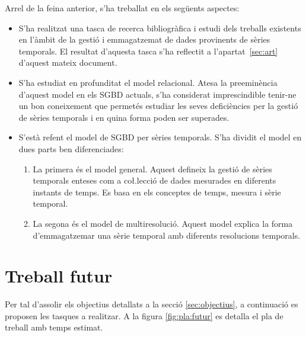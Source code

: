 Arrel de la feina anterior, s'ha treballat en els següents aspectes:
\begin{itemize}
\item S'ha realitzat una tasca de recerca bibliogràfica i estudi dels
  treballs existents en l'àmbit de la gestió i emmagatzemat de dades
  provinents de sèries temporals. El resultat d'aquesta tasca s'ha
  reflectit a l'apartat~\ref{sec:art} d'aquest mateix document.
\item S'ha estudiat en profunditat el model relacional. Atesa la
  preeminència d'aquest model en els SGBD actuals, s'ha considerat
  imprescindible tenir-ne un bon coneixement que permetés estudiar les
  seves deficiències per la gestió de sèries temporals i en quina
  forma poden ser superades.
\item S'està refent el model de SGBD per sèries temporals.  S'ha
  dividit el model en dues parts ben diferenciades:
  \begin{enumerate}
  \item La primera és el model general. Aquest defineix la gestió de
    sèries temporals enteses com a co\l.lecció de dades mesurades en
    diferents instants de temps. Es basa en els conceptes de temps,
    mesura i sèrie temporal.
  \item La segona és el model de multiresolució. Aquest model explica
    la forma d'emmagatzemar una sèrie temporal amb diferents
    resolucions temporals.
  \end{enumerate}
\end{itemize}


\section{Treball futur}

Per tal d'assolir els objectius detallats a la secció
\ref{sec:objectius}, a continuació es proposen les tasques a
realitzar.  A la figura \ref{fig:pla:futur} es detalla el pla de
treball amb temps estimat.





